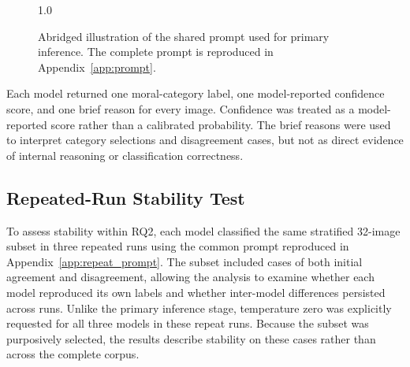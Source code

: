 \begin{figure}[H]
\begin{spacing}{1.0}
\end{spacing}

\caption{Abridged illustration of the shared prompt used for primary
inference. The complete prompt is reproduced in
Appendix~\ref{app:prompt}.}
\label{fig:primary_prompt}
\end{figure}

Each model returned one moral-category label, one model-reported confidence
score, and one brief reason for every image. Confidence was treated as a
model-reported score rather than a calibrated probability. The brief reasons
were used to interpret category selections and disagreement cases, but not as
direct evidence of internal reasoning or classification correctness.

\subsection{Repeated-Run Stability Test}
\label{subsec:stability_design}

To assess stability within RQ2, each model classified the same stratified
32-image subset in three repeated runs using the common prompt reproduced in
Appendix~\ref{app:repeat_prompt}. The subset
included cases of both initial agreement and disagreement, allowing the
analysis to examine whether each model reproduced its own labels and whether
inter-model differences persisted across runs. Unlike the primary inference
stage, temperature zero was explicitly requested for all three models in these
repeat runs. Because the subset was purposively selected, the results describe
stability on these cases rather than across the complete corpus.

